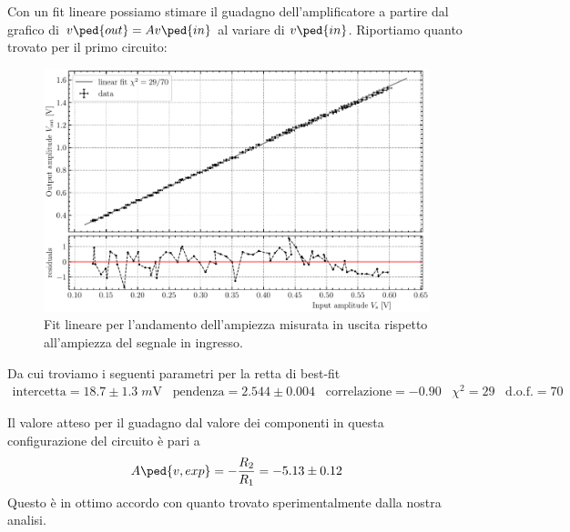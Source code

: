 \documentclass[10pt, a4paper, italian]{article}
\begin{document}
Con un fit lineare possiamo stimare il guadagno dell'amplificatore a partire
dal grafico di $v\ped{out} = A v\ped{in}$ al variare di $v\ped{in}$.
Riportiamo quanto trovato per il primo circuito:
\begin{figure}[htbp]
\centering
\includegraphics[scale=0.7]{gainfit}
\caption{Fit lineare per l'andamento dell'ampiezza misurata in uscita rispetto
all'ampiezza del segnale in ingresso. \label{fig: gainfit}}
\end{figure}
Da cui troviamo i seguenti parametri per la retta di best-fit
\begin{align*}
\text{intercetta} = 18.7 \pm 1.3 \; \si{m\V} \;\;\;
\text{pendenza} = 2.544 \pm 0.004 \;\;\; \text{correlazione} = -0.90
\;\;\; \chi^2 = 29 \;\;\; \text{d.o.f.} = 70
\end{align*}

Il valore atteso per il guadagno dal valore dei componenti in questa
configurazione del circuito è pari a
\[
A\ped{v, exp} = -\frac{R_2}{R_1} = - 5.13 \pm 0.12
\]
Questo è in ottimo accordo con quanto trovato sperimentalmente dalla nostra
analisi.
\end{document}
